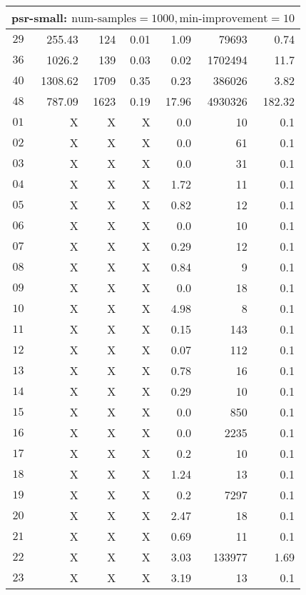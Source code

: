\begin{longtable}{|c||r|r|r||r|r|r|}
\multicolumn{7}{|l|}{psr-small: $\text{num-samples}=1000,\text{min-improvement}=10$}\\\hline
$29$ & 255.43 & 124 & 0.01 & 1.09 & 79693 & 0.74 \\\hline
$36$ & 1026.2 & 139 & 0.03 & 0.02 & 1702494 & 11.7 \\\hline
$40$ & 1308.62 & 1709 & 0.35 & 0.23 & 386026 & 3.82 \\\hline
$48$ & 787.09 & 1623 & 0.19 & 17.96 & 4930326 & 182.32 \\\hline
$01$ &  X &  X &  X & 0.0 & 10 & 0.1 \\\hline
$02$ &  X &  X &  X & 0.0 & 61 & 0.1 \\\hline
$03$ &  X &  X &  X & 0.0 & 31 & 0.1 \\\hline
$04$ &  X &  X &  X & 1.72 & 11 & 0.1 \\\hline
$05$ &  X &  X &  X & 0.82 & 12 & 0.1 \\\hline
$06$ &  X &  X &  X & 0.0 & 10 & 0.1 \\\hline
$07$ &  X &  X &  X & 0.29 & 12 & 0.1 \\\hline
$08$ &  X &  X &  X & 0.84 & 9 & 0.1 \\\hline
$09$ &  X &  X &  X & 0.0 & 18 & 0.1 \\\hline
$10$ &  X &  X &  X & 4.98 & 8 & 0.1 \\\hline
$11$ &  X &  X &  X & 0.15 & 143 & 0.1 \\\hline
$12$ &  X &  X &  X & 0.07 & 112 & 0.1 \\\hline
$13$ &  X &  X &  X & 0.78 & 16 & 0.1 \\\hline
$14$ &  X &  X &  X & 0.29 & 10 & 0.1 \\\hline
$15$ &  X &  X &  X & 0.0 & 850 & 0.1 \\\hline
$16$ &  X &  X &  X & 0.0 & 2235 & 0.1 \\\hline
$17$ &  X &  X &  X & 0.2 & 10 & 0.1 \\\hline
$18$ &  X &  X &  X & 1.24 & 13 & 0.1 \\\hline
$19$ &  X &  X &  X & 0.2 & 7297 & 0.1 \\\hline
$20$ &  X &  X &  X & 2.47 & 18 & 0.1 \\\hline
$21$ &  X &  X &  X & 0.69 & 11 & 0.1 \\\hline
$22$ &  X &  X &  X & 3.03 & 133977 & 1.69 \\\hline
$23$ &  X &  X &  X & 3.19 & 13 & 0.1 \\\hline

\end{longtable}
